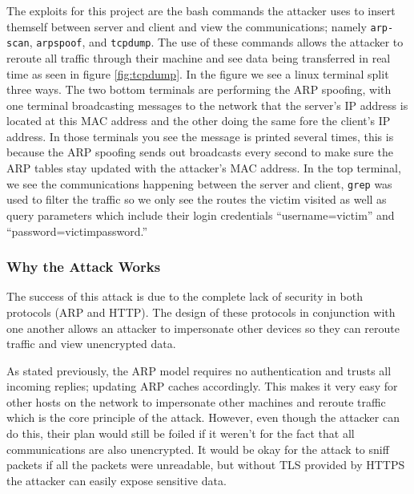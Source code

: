 \documentclass[11pt]{article}
\begin{document}
\par The exploits for this project are the bash commands the attacker uses to insert themself between server and client and view the communications; namely \texttt{arp-scan}, \texttt{arpspoof}, and \texttt{tcpdump}. The use of these commands allows the attacker to reroute all traffic through their machine and see data being transferred in real time as seen in figure \ref{fig:tcpdump}. In the figure we see a linux terminal split three ways. The two bottom terminals are performing the ARP spoofing, with one terminal broadcasting messages to the network that the server's IP address is located at this MAC address and the other doing the same fore the client's IP address. In those terminals you see the message is printed several times, this is because the ARP spoofing sends out broadcasts every second to make sure the ARP tables stay updated with the attacker's MAC address. In the top terminal, we see the communications happening between the server and client, \texttt{grep} was used to filter the traffic so we only see the routes the victim visited as well as query parameters which include their login credentials ``username=victim'' and ``password=victimpassword.''

\subsubsection{Why the Attack Works}
\par The success of this attack is due to the complete lack of security in both protocols (ARP and HTTP). The design of these protocols in conjunction with one another allows an attacker to impersonate other devices so they can reroute traffic and view unencrypted data.

\par As stated previously, the ARP model requires no authentication and trusts all incoming replies; updating ARP caches accordingly. This makes it very easy for other hosts on the network to impersonate other machines and reroute traffic which is the core principle of the attack. However, even though the attacker can do this, their plan would still be foiled if it weren't for the fact that all communications are also unencrypted. It would be okay for the attack to sniff packets if all the packets were unreadable, but without TLS provided by HTTPS the attacker can easily expose sensitive data.
\end{document}
